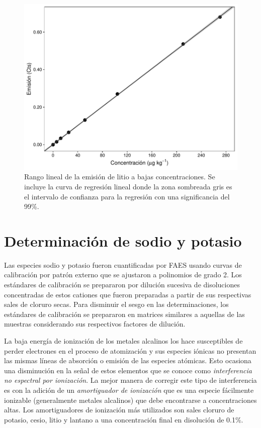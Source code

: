 \begin{figure}[H]
    \centering
    \includegraphics[height=0.388\textwidth]{App/images/LiRange.pdf}
    \caption[Rango lineal de la emisión de litio a bajas concentraciones]{Rango lineal de la emisión de litio a bajas concentraciones. Se incluye la curva de regresión lineal donde la zona sombreada gris es el intervalo de confianza para la regresión con una significancia del 99\%.}
    \label{fig:Rangolineal}
\end{figure}

\section{Determinación de sodio y potasio}
Las especies sodio y potasio fueron cuantificadas por \ac{FAES} usando curvas de calibración por patrón externo que se ajustaron a polinomios de grado 2. Los estándares de calibración se prepararon por dilución sucesiva de disoluciones concentradas de estos cationes que fueron preparadas a partir de sus respectivas sales de cloruro secas. Para disminuir el sesgo en las determinaciones, los estándares de calibración se prepararon en matrices similares a aquellas de las muestras considerando sus respectivos factores de dilución.

La baja energía de ionización de los metales alcalinos los hace susceptibles de perder electrones en el proceso de atomización y sus especies iónicas no presentan las mismas líneas de absorción o emisión de las especies atómicas. Esto ocasiona una disminución en la señal de estos elementos que se conoce como \textit{interferencia no espectral por ionización}. La mejor manera de corregir este tipo de interferencia es con la adición de un \textit{amortiguador de ionización} que es una especie fácilmente ionizable (generalmente metales alcalinos) que debe encontrarse a concentraciones altas. Los amortiguadores de ionización más utilizados son sales cloruro de potasio, cesio, litio y lantano a una concentración final en disolución de 0.1\%. 

